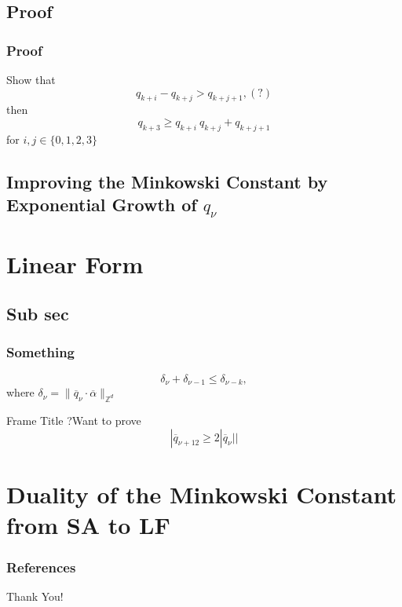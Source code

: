 \documentclass[aspectratio=1610]{beamer}
\begin{document}
\subsection {Proof}
\begin{frame}
  \frametitle{Proof}
Show that\[q_{k+i}-q_{k+j}>q_{k+j+1},(?)\] 
then
\[q_{k+3}\geq q_{k+i}\>q_{k+j}+q_{k+j+1} \]
for \(i,j\in\{0,1,2,3\}\)
\end{frame}



\subsection{Improving the Minkowski Constant by Exponential Growth of {$q_\nu$}}

\section {Linear Form}

\subsection {Sub sec}
\begin{frame}
  \frametitle{Something}
\[\delta_{\nu}+\delta_{\nu-1}\leq \delta_{\nu-k},\]
where $\delta_{\nu}=\|\overline{q}_{\nu}\cdot \overline{\alpha} \|_{\mathbb{Z}^d}$
\end{frame}

\begin{frame}{Frame Title}
    ?Want to prove 
    \[|\overline{q}_{\nu+12}\geq2|\overline{q}_\nu| |\]
\end{frame}

\section{Duality of the Minkowski Constant from SA to LF}




  \begin{frame}[allowframebreaks]
    \frametitle{References}
   \printbibliography
\end{frame}



\begin{frame}{}
\begin{center} \Huge Thank You! \end{center} 
\end{frame}
\end{document}
